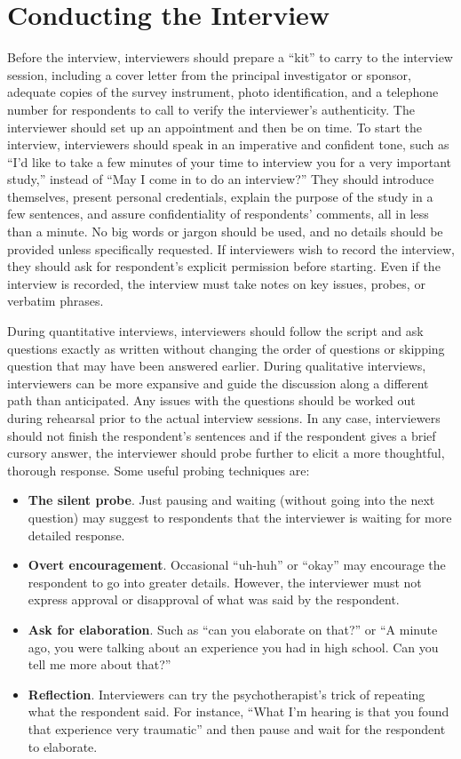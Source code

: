 \section{Conducting the Interview}

Before the interview, interviewers should prepare a ``kit'' to carry to the interview session, including a cover letter from the principal investigator or sponsor, adequate copies of the survey instrument, photo identification, and a telephone number for respondents to call to verify the interviewer's authenticity. The interviewer should set up an appointment and then be on time. To start the interview, interviewers should speak in an imperative and confident tone, such as ``I'd like to take a few minutes of your time to interview you for a very important study,'' instead of ``May I come in to do an interview?'' They should introduce themselves, present personal credentials, explain the purpose of the study in a few sentences, and assure confidentiality of respondents' comments, all in less than a minute. No big words or jargon should be used, and no details should be provided unless specifically requested. If interviewers wish to record the interview, they should ask for respondent's explicit permission before starting. Even if the interview is recorded, the interview must take notes on key issues, probes, or verbatim phrases.

During quantitative interviews, interviewers should follow the script and ask questions exactly as written without changing the order of questions or skipping question that may have been answered earlier. During qualitative interviews, interviewers can be more expansive and guide the discussion along a different path than anticipated. Any issues with the questions should be worked out during rehearsal prior to the actual interview sessions. In any case, interviewers should not finish the respondent's sentences and if the respondent gives a brief cursory answer, the interviewer should probe further to elicit a more thoughtful, thorough response. Some useful probing techniques are:

\begin{itemize}
	\item \textbf{The silent probe}. Just pausing and waiting (without going into the next question) may suggest to respondents that the interviewer is waiting for more detailed response.
	\item \textbf{Overt encouragement}. Occasional ``uh-huh'' or ``okay'' may encourage the respondent to go into greater details. However, the interviewer must not express approval or disapproval of what was said by the respondent.
	\item \textbf{Ask for elaboration}. Such as ``can you elaborate on that?'' or ``A minute ago, you were talking about an experience you had in high school. Can you tell me more about that?''
	\item \textbf{Reflection}. Interviewers can try the psychotherapist's trick of repeating what the respondent said. For instance, ``What I'm hearing is that you found that experience very traumatic'' and then pause and wait for the respondent to elaborate.
\end{itemize}

